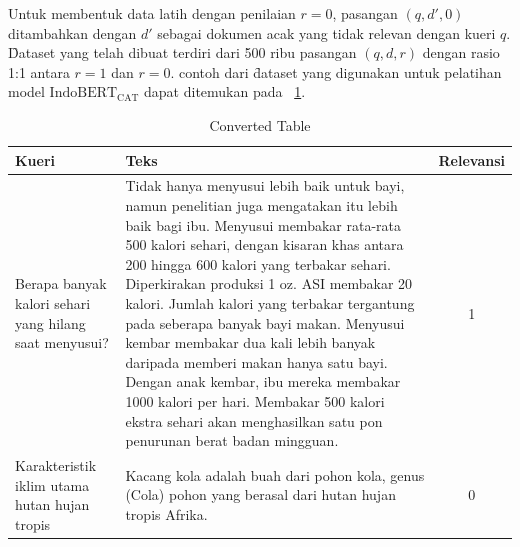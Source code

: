 Untuk membentuk data latih dengan penilaian $r=0$, pasangan $(q, d',0)$ ditambahkan dengan $d'$ sebagai dokumen acak yang tidak relevan dengan kueri $q$. \f{Dataset} yang telah dibuat terdiri dari 500 ribu pasangan $(q, d, r)$ dengan rasio 1:1 antara $r=1$ dan $r=0$. contoh dari \f{dataset} yang digunakan untuk pelatihan model $\text{IndoBERT}_{\text{CAT}}$ dapat ditemukan pada \tab~\ref{tab:converted-table}.

\begin{table}[!ht]
    \centering
    \caption{Converted Table}
    \label{tab:converted-table}
    \begin{tabular}{|p{2cm}|p{7cm}|c|} \hline
        \textbf{Kueri}                                         & \textbf{Teks}                                                                                                                                                                                                                                                                                                                                                                                                                                                                                                                                                                                             & \textbf{Relevansi} \\ \hline
        Berapa banyak kalori sehari yang hilang saat menyusui? & Tidak hanya menyusui lebih baik untuk bayi, namun penelitian juga mengatakan itu lebih baik bagi ibu. Menyusui membakar rata-rata 500 kalori sehari, dengan kisaran khas antara 200 hingga 600 kalori yang terbakar sehari. Diperkirakan produksi 1 oz. ASI membakar 20 kalori. Jumlah kalori yang terbakar tergantung pada seberapa banyak bayi makan. Menyusui kembar membakar dua kali lebih banyak daripada memberi makan hanya satu bayi. Dengan anak kembar, ibu mereka membakar 1000 kalori per hari. Membakar 500 kalori ekstra sehari akan menghasilkan satu pon penurunan berat badan mingguan. & 1                  \\ \hline
        Karakteristik iklim utama hutan hujan tropis           & Kacang kola adalah buah dari pohon kola, genus (Cola) pohon yang berasal dari hutan hujan tropis Afrika.                                                                                                                                                                                                                                                                                                                                                                                                                                                                                                  & 0                  \\ \hline

\end{tabular}
\end{table}
